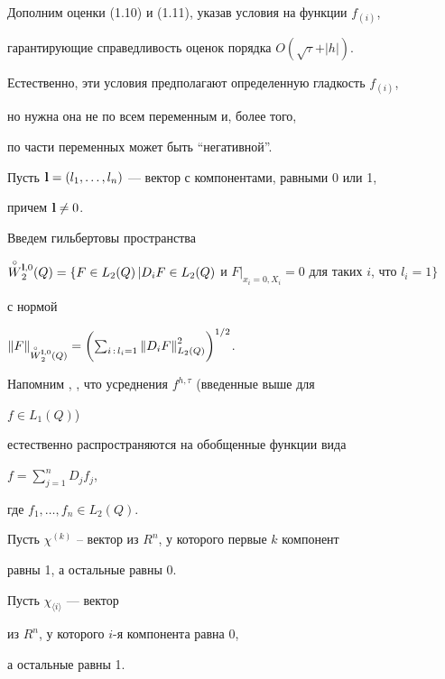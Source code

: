 Дополним оценки (1.10) и (1.11), указав условия на функции $f_{(i)}$,


гарантирующие справедливость оценок порядка $O(\sqrt\tau+\vert h\vert)$.


Естественно, эти условия предполагают определенную гладкость $f_{(i)}$,


но нужна она не по всем переменным и, более того,


по части переменных может быть ``негативной''.





Пусть ${\bold l}=(l_1,\dotsc,l_n)$ --- вектор с компонентами, равными 0 или 1, 


причем ${\bold l}\ne 0$.


Введем гильбертовы пространства


$\overset{\circ}{W}{}_2^{{\bold l},0}(Q)=\{F\in L_2(Q)\,\vert


D_i F\in L_2(Q)$ и $ F\vert_{x_i=0,X_i}=0$ для таких $i$, что $l_i=1\}$


с нормой 


${\ver F\ver}_{\overset{\circ}{W}{}_2^{{\bold l},0}(Q)}=\biggl(


\sum_{i\,:\, l_i=1}{\ver D_iF\ver}^2_{L_2(Q)}\biggr)^{1/2}$. 


Напомним \cite{Z1}, \cite{Za}, что усреднения $f^{h,\tau}$ (введенные выше для


$f\in L_1(Q)$)


естественно распространяются на обобщенные функции вида


$f=\sum_{j=1}^nD_jf_j$,


где $f_1,\dotsc,f_n\in L_2(Q)$.





Пусть $\chi^{(k)}$ -- вектор из $R^n$, у которого первые $k$ компонент 


равны 1, а остальные равны 0.


Пусть $\chi_{\langle i\rangle}$ --- вектор


из $R^n$, у которого $i$-я компонента равна 0, 


а остальные равны 1.





